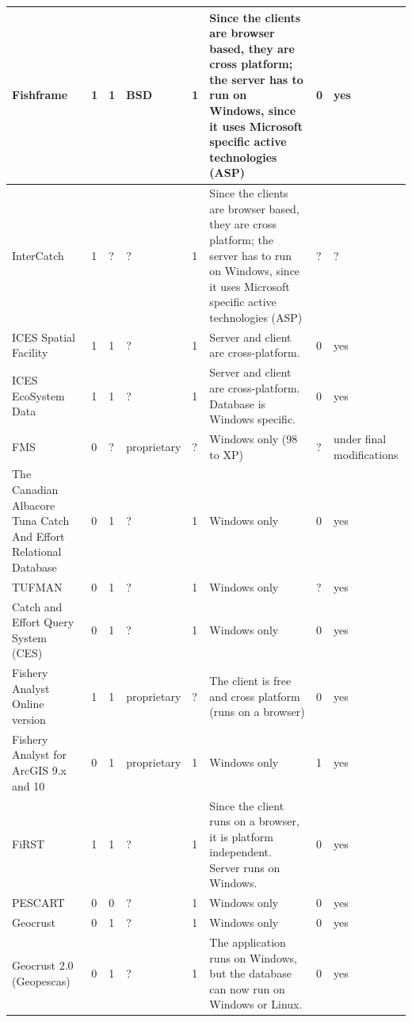 \documentclass[11pt]{article} %
\begin{document}
\begin{center}
\begin{supertabular}{ | p{0.1\textwidth} | p{0.05\textwidth} | p{0.05\textwidth} | p{0.05\textwidth} | p{0.05\textwidth} | p{0.2\textwidth} | p{0.05\textwidth} | p{0.05\textwidth} |}
Fishframe & 1 & 1 & BSD & 1 & Since the clients are browser based, they are cross platform; the server has to run on Windows, since it uses Microsoft specific active technologies (ASP) & 0 & yes \\ \hline
InterCatch & 1 &  & ? & 1 & Since the clients are browser based, they are cross platform; the server has to run on Windows, since it uses Microsoft specific active technologies (ASP) &  & ? \\ \hline
ICES Spatial Facility & 1 & 1 & ? & 1 & Server and client are cross-platform. & 0 & yes \\ \hline
ICES EcoSystem Data & 1 & 1 & ? & 1 & Server and client are cross-platform. Database is Windows specific. & 0 & yes \\ \hline
FMS & 0 &  & proprietary &  & Windows only (98 to XP) &  & under final modifications \\ \hline
The Canadian Albacore Tuna Catch And Effort Relational Database & 0 & 1 & ? & 1 & Windows only & 0 & yes \\ \hline
TUFMAN & 0 & 1 & ? & 1 & Windows only &  & yes \\ \hline
Catch and Effort Query System (CES) & 0 & 1 & ? & 1 & Windows only & 0 & yes \\ \hline
Fishery Analyst Online version & 1 & 1 & proprietary &  & The client is free and cross platform (runs on a browser) & 0 & yes \\ \hline
Fishery Analyst for ArcGIS 9.x and 10 & 0 & 1 & proprietary & 1 & Windows only & 1 & yes \\ \hline
FiRST & 1 & 1 & ? & 1 & Since the client runs on a browser, it is platform independent. Server runs on Windows. & 0 & yes \\ \hline
PESCART & 0 & 0 & ? & 1 & Windows only & 0 & yes \\ \hline
Geocrust & 0 & 1 & ? & 1 & Windows only & 0 & yes \\ \hline
Geocrust 2.0 (Geopescas) & 0 & 1 & ? & 1 & The application runs on Windows, but the database can now run on Windows or Linux. & 0 & yes \\ \hline

\end{supertabular}
\end{center}
\end{document}
